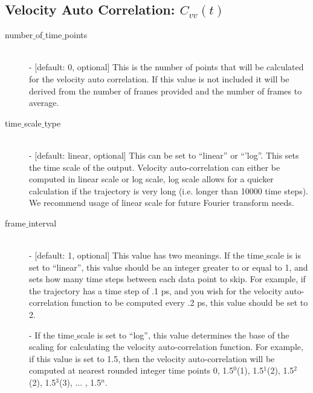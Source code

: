 \documentclass{article}
\begin{document}
\subsection{Velocity Auto Correlation: $C_{vv}(t)$} \label{sec::VACF_parm}
\begin{description}	
	\item[number$\_$of$\_$time$\_$points]\hfill \\
	- [default: 0, optional] This is the number of points that will be calculated for the velocity auto correlation.  If this value is not included it will be derived from the number of frames provided and the number of frames to average.
	
	\item[time$\_$scale$\_$type] \hfill \\
	- [default: linear, optional] This can be set to ``linear'' or ``'log''.  This sets the time scale of the output. Velocity auto-correlation can either be computed in linear scale or log scale, log scale allows for a quicker calculation if the trajectory is very long (i.e. longer than 10000 time steps). We recommend usage of linear scale for future Fourier transform needs.
	
	\item[frame$\_$interval] \hfill \\
	- [default: 1, optional] This value has two meanings.  If the time$\_$scale is is set to ``linear'', this value should be an integer greater to or equal to 1, and sets how many time steps between each data point to skip.  For example, if the trajectory has a time step of .1 ps, and you wish for the velocity auto-correlation function to be computed every .2 ps, this value should be set to 2. 
	
	- If the time$\_$scale is set to ``log'', this value determines the base of the scaling for calculating the velocity auto-correlation function.  For example, if this value is set to 1.5, then the velocity auto-correlation will be computed at nearest rounded integer time points 0, 1.5$^0$(1), 1.5$^1$(2), 1.5$^2$(2), 1.5$^3$(3), ... , 1.5$^{n}$.
	
\end{description}
\end{document}
